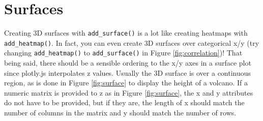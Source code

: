 \documentclass[
  12pt,
]{krantz}
\newenvironment{Shaded}{\begin{snugshade}}{\end{snugshade}}
\newcommand{\DataTypeTok}[1]{\textcolor[rgb]{0.13,0.29,0.53}{#1}}
\newcommand{\DecValTok}[1]{\textcolor[rgb]{0.00,0.00,0.81}{#1}}
\newcommand{\KeywordTok}[1]{\textcolor[rgb]{0.13,0.29,0.53}{\textbf{#1}}}
\newcommand{\NormalTok}[1]{#1}
\newcommand{\OperatorTok}[1]{\textcolor[rgb]{0.81,0.36,0.00}{\textbf{#1}}}
\newcommand{\StringTok}[1]{\textcolor[rgb]{0.31,0.60,0.02}{#1}}
\begin{document}
\hypertarget{surfaces}{%
\section{Surfaces}\label{surfaces}}


Creating 3D surfaces with \texttt{add\_surface()} is a lot like creating heatmaps with \texttt{add\_heatmap()}. In fact, you can even create 3D surfaces over categorical x/y (try changing \texttt{add\_heatmap()} to \texttt{add\_surface()} in Figure \ref{fig:correlation})! That being said, there should be a sensible ordering to the x/y axes in a surface plot since plotly.js interpolates z values. Usually the 3D surface is over a continuous region, as is done in Figure \ref{fig:surface} to display the height of a volcano. If a numeric matrix is provided to z as in Figure \ref{fig:surface}, the x and y attributes do not have to be provided, but if they are, the length of x should match the number of columns in the matrix and y should match the number of rows.

\begin{Shaded}
\end{Shaded}
\end{document}
